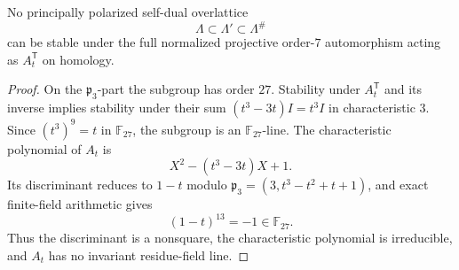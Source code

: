 \begin{corollary}\label{cor:noAstablepp}
No principally polarized self-dual overlattice
\[
 \Lambda\subset\Lambda'\subset\Lambda^\#
\]
can be stable under the full normalized projective order-$7$ automorphism acting as $A_t^{\mathsf T}$ on homology.
\end{corollary}
\begin{proof}
On the $\mathfrak p_3$-part the subgroup has order $27$. Stability under
$A_t^{\mathsf T}$ and its inverse implies stability under their sum
$(t^3-3t)I=t^3I$ in characteristic $3$. Since $(t^3)^9=t$ in
$\mathbb F_{27}$, the subgroup is an $\mathbb F_{27}$-line.  The characteristic polynomial of $A_t$ is
\[
 X^2-(t^3-3t)X+1.
\]
Its discriminant reduces to $1-t$ modulo
$\mathfrak p_3=(3,t^3-t^2+t+1)$, and exact finite-field arithmetic gives
\[
 (1-t)^{13}=-1\in\mathbb F_{27}.
\]
Thus the discriminant is a nonsquare, the characteristic polynomial is irreducible, and
$A_t$ has no invariant residue-field line.
\end{proof}


